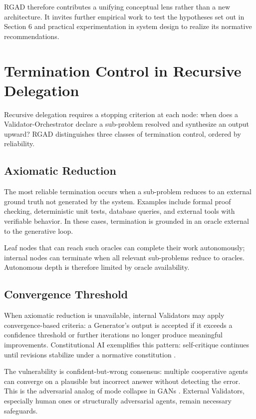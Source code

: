 \documentclass[11pt,a4paper]{article}
\begin{document}
RGAD therefore contributes a unifying conceptual lens rather than a new architecture. It invites further empirical work to test the hypotheses set out in Section 6 and practical experimentation in system design to realize its normative recommendations.

\appendix

\section{Termination Control in Recursive Delegation}
Recursive delegation requires a stopping criterion at each node: when does a Validator-Orchestrator declare a sub-problem resolved and synthesize an output upward? RGAD distinguishes three classes of termination control, ordered by reliability.

\subsection{Axiomatic Reduction}
The most reliable termination occurs when a sub-problem reduces to an external ground truth not generated by the system. Examples include formal proof checking, deterministic unit tests, database queries, and external tools with verifiable behavior. In these cases, termination is grounded in an oracle external to the generative loop.

Leaf nodes that can reach such oracles can complete their work autonomously; internal nodes can terminate when all relevant sub-problems reduce to oracles. Autonomous depth is therefore limited by oracle availability.

\subsection{Convergence Threshold}
When axiomatic reduction is unavailable, internal Validators may apply convergence-based criteria: a Generator's output is accepted if it exceeds a confidence threshold or further iterations no longer produce meaningful improvements. Constitutional AI exemplifies this pattern: self-critique continues until revisions stabilize under a normative constitution \citep{bai2022}.

The vulnerability is confident-but-wrong consensus: multiple cooperative agents can converge on a plausible but incorrect answer without detecting the error. This is the adversarial analog of mode collapse in GANs \citep{goodfellow2014}. External Validators, especially human ones or structurally adversarial agents, remain necessary safeguards.
\end{document}

